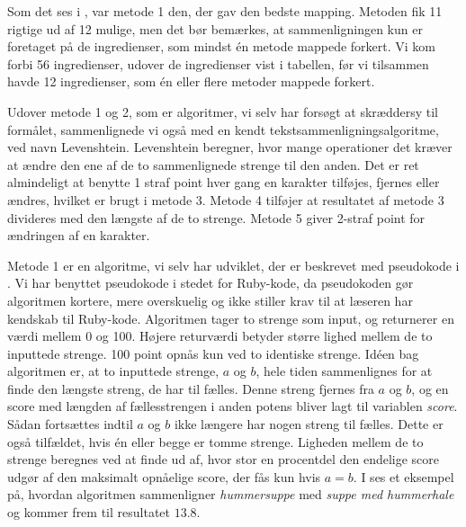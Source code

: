 {
\ourrow{~                                                        }{ ~                       & ~                                & ~                    & ~                    & ~                    }
}

Som det ses i , var metode 1 den, der gav den bedste mapping. Metoden fik 11 rigtige ud af 12 mulige, men det bør bemærkes, at sammenligningen kun er foretaget på de ingredienser, som mindst én metode mappede forkert. Vi kom forbi 56 ingredienser, udover de ingredienser vist i tabellen, før vi tilsammen havde 12 ingredienser, som én eller flere metoder mappede forkert. 

Udover metode 1 og 2, som er algoritmer, vi selv har forsøgt at skræddersy til formålet, sammenlignede vi også med en kendt tekstsammenligningsalgoritme, ved navn Levenshtein. Levenshtein beregner, hvor mange operationer det kræver at ændre den ene af de to sammenlignede strenge til den anden\cite{levenshtein}. Det er ret almindeligt at benytte 1 straf point hver gang en karakter tilføjes, fjernes eller ændres, hvilket er brugt i metode 3.  Metode 4 tilføjer at resultatet af metode 3 divideres med den længste af de to strenge. Metode 5 giver 2-straf point for ændringen af en karakter.
 
Metode 1 er en algoritme, vi selv har udviklet, der er beskrevet med pseudokode i . Vi har benyttet pseudokode i stedet for Ruby-kode, da pseudokoden gør algoritmen kortere, mere overskuelig og ikke stiller krav til at læseren har kendskab til Ruby-kode. Algoritmen tager to strenge som input, og returnerer en værdi mellem 0 og 100. Højere returværdi betyder større lighed mellem de to inputtede strenge. 100 point opnås kun ved to identiske strenge. Idéen bag algoritmen er, at to inputtede strenge, $a$ og $b$, hele tiden sammenlignes for at finde den længste streng, de har til fælles. Denne streng fjernes fra $a$ og $b$, og en score med længden af fællesstrengen i anden potens bliver lagt til variablen \textit{score}. Sådan fortsættes indtil $a$ og $b$ ikke længere har nogen streng til fælles. Dette er også tilfældet, hvis én eller begge er tomme strenge. Ligheden mellem de to strenge beregnes ved at finde ud af, hvor stor en procentdel den endelige score udgør af den maksimalt opnåelige score, der fås kun hvis $a = b$.
I  ses et eksempel på, hvordan algoritmen sammenligner \textit{hummersuppe} med \textit{suppe med hummerhale} og kommer frem til resultatet $13.8$.

